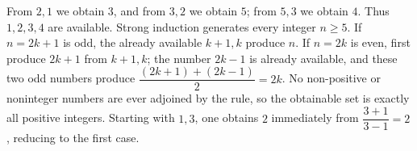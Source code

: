 From $2,1$ we obtain $3$, and from $3,2$ we obtain $5$; from $5,3$ we obtain $4$. Thus $1,2,3,4$ are available. Strong induction generates every integer $n\ge5$. If $n=2k+1$ is odd, the already available $k+1,k$ produce $n$. If $n=2k$ is even, first produce $2k+1$ from $k+1,k$; the number $2k-1$ is already available, and these two odd numbers produce $\dfrac{(2k+1)+(2k-1)}{2}=2k$. No non-positive or noninteger numbers are ever adjoined by the rule, so the obtainable set is exactly all positive integers. Starting with $1,3$, one obtains $2$ immediately from $\dfrac{3+1}{3-1}=2$, reducing to the first case.
